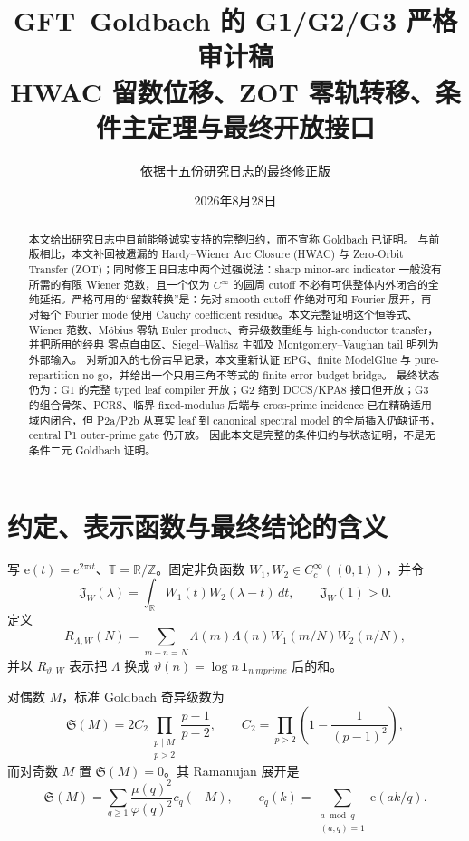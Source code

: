 \documentclass[11pt,a4paper]{ctexart}
\title{GFT--Goldbach 的 G1/G2/G3 严格审计稿\\
\large HWAC 留数位移、ZOT 零轨转移、条件主定理与最终开放接口}
\author{依据十五份研究日志的最终修正版}
\date{2026年8月28日}
\theoremstyle{definition}
\newcommand{\T}{\mathbb T}
\newcommand{\e}{\mathrm e}
\newcommand{\1}{\mathbf 1}
\begin{document}
\maketitle
\sloppy

\begin{abstract}
\sloppy
本文给出研究日志中目前能够诚实支持的完整归约，而不宣称 Goldbach 已证明。
与前版相比，本文补回被遗漏的 Hardy--Wiener Arc Closure (HWAC) 与
Zero-Orbit Transfer (ZOT)；同时修正旧日志中两个过强说法：sharp minor-arc
indicator 一般没有所需的有限 Wiener 范数，且一个仅为 $C^\infty$ 的圆周
cutoff 不必有可供整体内外闭合的全纯延拓。严格可用的“留数转换”是：先对
smooth cutoff 作绝对可和 Fourier 展开，再对每个 Fourier mode 使用 Cauchy
coefficient residue。本文完整证明这个恒等式、Wiener 范数、Möbius 零轨
Euler product、奇异级数重组与 high-conductor transfer，并把所用的经典
零点自由区、Siegel--Walfisz 主弧及 Montgomery--Vaughan tail 明列为外部输入。
对新加入的七份古早记录，本文重新认证 EPG、finite ModelGlue 与
pure-repartition no-go，并给出一个只用三角不等式的 finite error-budget bridge。
最终状态仍为：G1 的完整 typed leaf compiler 开放；G2 缩到 DCCS/KPA8
接口但开放；G3 的组合骨架、PCRS、临界 fixed-modulus 后端与 cross-prime
incidence 已在精确适用域内闭合，但 P2a/P2b 从真实 leaf 到 canonical spectral
model 的全局插入仍缺证书，central P1 outer-prime gate 仍开放。
因此本文是完整的条件归约与状态证明，不是无条件二元 Goldbach 证明。
\end{abstract}

\section{约定、表示函数与最终结论的含义}

写 $\e(t)=e^{2\pi i t}$、$\T=\mathbb R/\mathbb Z$。固定非负函数
$W_1,W_2\in C_c^\infty((0,1))$，并令
\[
\mathfrak J_W(\lambda)=\int_{\mathbb R}W_1(t)W_2(\lambda-t)\,dt,
\qquad \mathfrak J_W(1)>0.
\tag{1.1}
\]
定义
\[
R_{\Lambda,W}(N)=\sum_{m+n=N}\Lambda(m)\Lambda(n)
 W_1(m/N)W_2(n/N),                                      \tag{1.2}
\]
并以 $R_{\vartheta,W}$ 表示把 $\Lambda$ 换成
$\vartheta(n)=\log n\,\1_{n\ {
m prime}}$ 后的和。

对偶数 $M$，标准 Goldbach 奇异级数为
\[
\mathfrak S(M)=2C_2\prod_{\substack{p\mid M\\p>2}}\frac{p-1}{p-2},
\qquad
C_2=\prod_{p>2}\left(1-\frac1{(p-1)^2}\right),          \tag{1.3}
\]
而对奇数 $M$ 置 $\mathfrak S(M)=0$。其 Ramanujan 展开是
\[
\mathfrak S(M)=\sum_{q\ge1}\frac{\mu(q)^2}{\varphi(q)^2}c_q(-M),
\qquad
c_q(k)=\sum_{\substack{a\bmod q\\(a,q)=1}}\e(ak/q).   \tag{1.4}
\]
\end{document}
